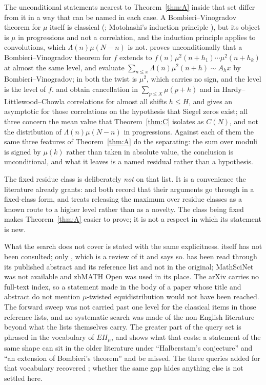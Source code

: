 \documentclass[11pt,a4paper]{article}
\theoremstyle{plain}
\theoremstyle{definition}
\theoremstyle{remark}
\begin{document}
The unconditional statements nearest to Theorem~\ref{thm:A} inside
that set differ from it in a way that can be named in each case. A
Bombieri--Vinogradov theorem for $\mu$ itself is classical
(\cite{Lev84}; Motohashi's induction principle \cite{Mot76}), but its
object is $\mu$ in progressions and not a correlation, and the
induction principle applies to convolutions, which
$\Lambda(n)\mu(N-n)$ is not. \cite{Vat19} proves unconditionally that
a Bombieri--Vinogradov theorem for $f$ extends to
$f(n)\mu^{2}(n+h_1)\cdots\mu^{2}(n+h_k)$ at almost the same level, and
\cite{MV17} evaluate $\sum_{n\le x}\Lambda(n)\mu^{2}(n+h)\sim A_hx$ by
Bombieri--Vinogradov; in both the twist is $\mu^{2}$, which carries no
sign, and the level is the level of $f$. \cite{LiSP} and \cite{LT}
obtain cancellation in $\sum_{p\le X}\mu(p+h)$ and in
Hardy--Littlewood--Chowla correlations for almost all shifts $h\le H$,
and \cite{TT} gives an asymptotic for those correlations on the
hypothesis that Siegel zeros exist; all three concern the mean value
that Theorem~\ref{thm:C} isolates as $C(N)$, and not the distribution
of $\Lambda(n)\mu(N-n)$ in progressions. Against each of them the same
three features of Theorem~\ref{thm:A} do the separating: the sum over
moduli is signed by $\mu(k)$ rather than taken in absolute value, the
conclusion is unconditional, and what it leaves is a named residual
rather than a hypothesis.

The fixed residue class is deliberately \emph{not} on that list. It is
a convenience the literature already grants: \cite{MV17} and \cite{HL}
both record that their arguments go through in a fixed-class form, and
\cite[Notes to \S20.5]{MoV2} treats releasing the maximum over residue
classes as a known route to a higher level rather than as a novelty.
The class being fixed makes Theorem~\ref{thm:A} easier to prove; it is
not a respect in which its statement is new.

What the search does not cover is stated with the same explicitness.
\cite{Pan} itself has not been consulted; only \cite{Shiu}, which is a
review of it and says so. \cite{Vat19} has been read through its
published abstract and its reference list and not in the original;
MathSciNet was not available and zbMATH Open was used in its place.
The arXiv carries no full-text index, so a statement made in the body
of a paper whose title and abstract do not mention $\mu$-twisted
equidistribution would not have been reached. The forward sweep was
not carried past one level for the classical items in those reference
lists, and no systematic search was made of the non-English literature
beyond what the lists themselves carry. The greater part of the query
set is phrased in the vocabulary of $EH_\mu$, and \cite{Shiu} shows
what that costs: a statement of the same shape can sit in the older
literature under ``Halberstam's conjecture'' and ``an extension of
Bombieri's theorem'' and be missed. The three queries added for that
vocabulary recovered \cite{Shiu}; whether the same gap hides anything
else is not settled here.
\end{document}
